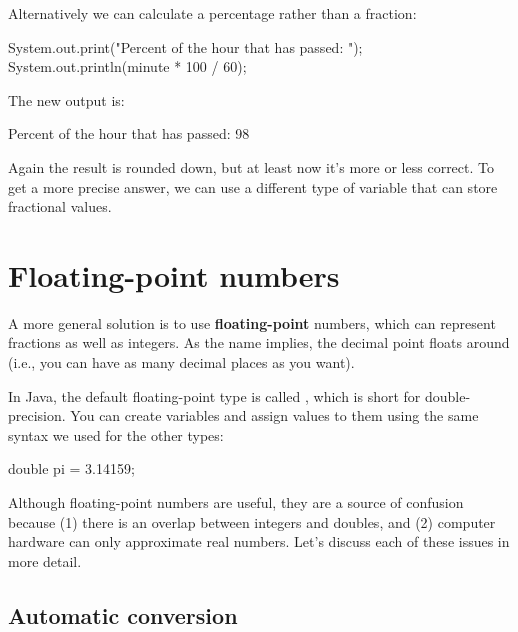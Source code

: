 Alternatively we can calculate a percentage rather than a fraction:

\begin{code}
    System.out.print("Percent of the hour that has passed: ");
    System.out.println(minute * 100 / 60);
\end{code}

The new output is:

\begin{stdout}
Percent of the hour that has passed: 98
\end{stdout}

Again the result is rounded down, but at least now it's more or less correct.
To get a more precise answer, we can use a different type of variable that can store fractional values.


\section{Floating-point numbers}


A more general solution is to use {\bf floating-point} numbers, which can represent fractions as well as integers.
As the name implies, the decimal point floats around (i.e., you can have as many decimal places as you want).

In Java, the default floating-point type is called , which is short for double-precision.
You can create  variables and assign values to them using the same syntax we used for the other types:

\begin{code}
    double pi = 3.14159;
\end{code}

Although floating-point numbers are useful, they are a source of confusion because (1) there is an overlap between integers and doubles, and (2) computer hardware can only approximate real numbers.
Let's discuss each of these issues in more detail.

\subsection{Automatic conversion}


